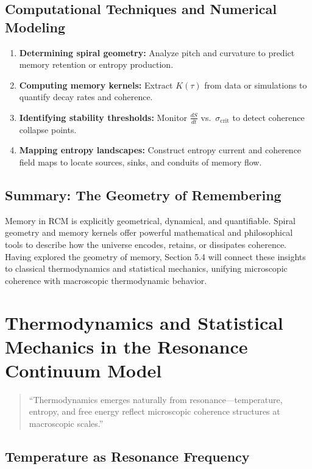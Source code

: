 \subsection{Computational Techniques and Numerical Modeling}

\begin{enumerate}
  \item \textbf{Determining spiral geometry:}  
    Analyze pitch and curvature to predict memory retention or entropy production.
  \item \textbf{Computing memory kernels:}  
    Extract \(K(\tau)\) from data or simulations to quantify decay rates and coherence.
  \item \textbf{Identifying stability thresholds:}  
    Monitor \(\tfrac{dS}{dt}\) vs.\ \(\sigma_{\mathrm{crit}}\) to detect coherence collapse points.
  \item \textbf{Mapping entropy landscapes:}  
    Construct entropy current and coherence field maps to locate sources, sinks, and conduits of memory flow.
\end{enumerate}

\subsection{Summary: The Geometry of Remembering}

Memory in RCM is explicitly geometrical, dynamical, and quantifiable.  Spiral geometry and memory kernels offer powerful mathematical and philosophical tools to describe how the universe encodes, retains, or dissipates coherence.  Having explored the geometry of memory, Section 5.4 will connect these insights to classical thermodynamics and statistical mechanics, unifying microscopic coherence with macroscopic thermodynamic behavior.

\section{Thermodynamics and Statistical Mechanics in the Resonance Continuum Model}

\begin{quote}
“Thermodynamics emerges naturally from resonance—temperature, entropy, and free energy reflect microscopic coherence structures at macroscopic scales.”
\end{quote}

\subsection{Temperature as Resonance Frequency}

